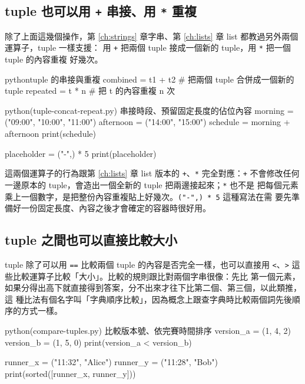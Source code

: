\subsection*{tuple 也可以用 \texttt{+} 串接、用 \texttt{*} 重複}

除了上面這幾個操作，第 \ref{ch:strings} 章字串、第 \ref{ch:lists} 章 list 都教過另外兩個運算子，tuple 一樣支援：
用 \texttt{+} 把兩個 tuple 接成一個新的 tuple，用 \texttt{*} 把一個 tuple 的內容重複
好幾次。

\begin{code}{python}{tuple 的串接與重複}
combined = t1 + t2   # 把兩個 tuple 合併成一個新的 tuple
repeated = t * n      # 把 t 的內容重複 n 次
\end{code}

\begin{example}{python}{(tuple-concat-repeat.py) 串接時段、預留固定長度的佔位內容}
morning = ("09:00", "10:00", "11:00")
afternoon = ("14:00", "15:00")
schedule = morning + afternoon
print(schedule)

placeholder = ("-",) * 5
print(placeholder)
\end{example}


這兩個運算子的行為跟第 \ref{ch:lists} 章 list 版本的 \texttt{+}、\texttt{*} 完全對應：\texttt{+}
不會修改任何一邊原本的 tuple，會造出一個全新的 tuple 把兩邊接起來；\texttt{*} 也不是
把每個元素乘上一個數字，是把整份內容重複貼上好幾次。\texttt{("-",) * 5} 這種寫法在需
要先準備好一份固定長度、內容之後才會確定的容器時很好用。

\subsection*{tuple 之間也可以直接比較大小}

tuple 除了可以用 \texttt{==} 比較兩個 tuple 的內容是否完全一樣，也可以直接用
\texttt{<}、\texttt{>} 這些比較運算子比較「大小」。比較的規則跟比對兩個字串很像：先比
第一個元素，如果分得出高下就直接得到答案，分不出來才往下比第二個、第三個，以此類推，這
種比法有個名字叫「字典順序比較」，因為概念上跟查字典時比較兩個詞先後順序的方式一樣。

\begin{example}{python}{(compare-tuples.py) 比較版本號、依完賽時間排序}
version_a = (1, 4, 2)
version_b = (1, 5, 0)
print(version_a < version_b)

runner_x = ("11:32", "Alice")
runner_y = ("11:28", "Bob")
print(sorted([runner_x, runner_y]))
\end{example}

